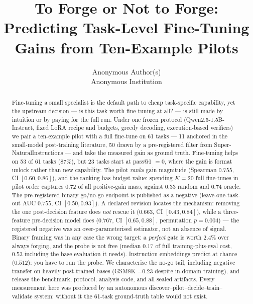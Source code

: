 \documentclass{article}
\title{To Forge or Not to Forge: Predicting Task-Level Fine-Tuning Gains from Ten-Example Pilots}
\author{%
  Anonymous Author(s) \\
  Anonymous Institution \\
}
\begin{document}
\maketitle

\begin{abstract}
Fine-tuning a small specialist is the default path to cheap
task-specific capability, yet the upstream decision --- is this
task worth fine-tuning at all? --- is still made by intuition or
by paying for the full run. Under one frozen protocol
(Qwen2.5-1.5B-Instruct, fixed LoRA recipe and budgets, greedy
decoding, execution-based verifiers) we pair a ten-example pilot
with a full fine-tune on 61 tasks --- 11 anchored in the
small-model post-training literature, 50 drawn by a pre-registered
filter from Super-NaturalInstructions --- and take the measured
gain as ground truth. Fine-tuning helps on 53 of 61 tasks (87\%),
but 23 tasks start at pass@1 $=0$, where the gain is format unlock
rather than new capability. The pilot \emph{ranks} gain magnitude
(Spearman $0.755$, CI $[0.60,0.86]$), and the ranking has budget
value: spending $K{=}20$ full fine-tunes in pilot order captures
$0.72$ of all positive-gain mass, against $0.33$ random and $0.74$
oracle. The pre-registered binary go/no-go endpoint is published
as a negative (leave-one-task-out AUC $0.755$, CI $[0.50,0.93]$).
A declared revision locates the mechanism: removing the one
post-decision feature does \emph{not} rescue it ($0.663$,
CI $[0.43,0.84]$), while a three-feature pre-decision model does
($0.767$, CI $[0.65,0.88]$, permutation $p{=}0.004$) --- the
registered negative was an over-parameterised estimator, not an
absence of signal. Binary framing was in any case the wrong
target: a \emph{perfect} gate is worth $2.4\%$ over always
forging, and the probe is not free (median $0.17$ of full
training-plus-eval cost, $0.53$ including the base evaluation it
needs). Instruction embeddings predict at chance ($0.512$): you
have to run the probe. We characterise the no-go tail, including
negative transfer on heavily post-trained bases (GSM8K $-0.23$
despite in-domain training), and release the benchmark, protocol,
analysis code, and all sealed artifacts. Every measurement here
was produced by an autonomous
discover--pilot--decide--train--validate system; without it the
61-task ground-truth table would not exist.
\end{abstract}
\end{document}
